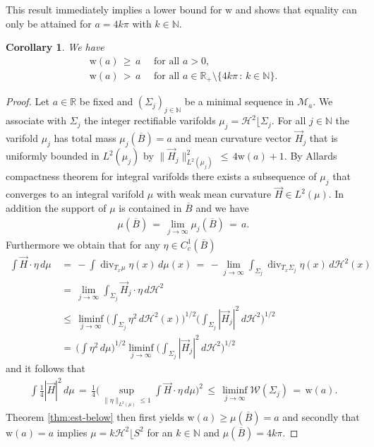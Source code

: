 \documentclass[reqno,makeidx,12pt]{amsart}
\theoremstyle{note}
\newtheorem{corollary}{Corollary}
\theoremstyle{definition}
\begin{document}
This result immediately implies a lower bound for ${\text{w}}$ and shows that equality can only be attained for $a=4k\pi$ with $k\in{\ensuremath{\mathbb{N}}}$.
\begin{corollary}\label{cor:est-below}
We have
\begin{gather*}
  {\text{w}}(a)\,\geq\, a\quad \text{ for all }a>0,\\
  {\text{w}}(a)\,>\, a\quad\text{ for all }a\in {\mathbb R}_+\setminus\{4k\pi
  \,:\,k\in{\ensuremath{\mathbb{N}}}\}.
\end{gather*}
\end{corollary}
\begin{proof}
Let $a\in{\mathbb R}$ be fixed and $(\Sigma_j)_{j\in{\ensuremath{\mathbb{N}}}}$ be a minimal sequence in
${\mathcal{M}}_a$. We associate with $\Sigma_j$ the integer rectifiable varifolds $\mu_j={\ensuremath{\mathcal{H}}}^2\lfloor
\Sigma_j$. For all $j\in {\ensuremath{\mathbb{N}}}$ the varifold $\mu_j$ has total mass $\mu_j(\overline{B})=a$ and 
mean curvature vector $\vec{H}_j$ that is uniformly bounded in $L^2(\mu_j)$ by $\|\vec{H}_j\|_{L^2(\mu_j)}^2\,\leq\,4{\text{w}}(a)+1$. By
Allards compactness theorem for integral varifolds \cite{Alla72}  there exists a
subsequence of $\mu_j$ that converges to an integral varifold $\mu$ with weak mean
curvature $\vec{H}\in L^2(\mu)$. In addition the support of $\mu$ is contained in $\overline{B}$ and we have
\begin{gather*}
  \mu(\overline{B})\,=\,\lim_{j\to\infty} \mu_j(\overline{B})\,=\, a.
\end{gather*}
Furthermore we obtain that for any $\eta\in C^1_c(\overline{B})$
\begin{align*}
  \int \vec{H}\cdot\eta\,d\mu \,&=\, -\int
  \operatorname{div}_{T_x\mu}\eta(x)\,d\mu(x) \,=\, -\lim_{j\to\infty}\int_{\Sigma_j}
  \operatorname{div}_{T_x\Sigma_j}\eta(x)\,d{\ensuremath{\mathcal{H}}}^2(x) \\
  &=\, \lim_{j\to\infty}\int_{\Sigma_j}
  \vec{H}_j\cdot\eta\,d{\ensuremath{\mathcal{H}}}^2 \\
  &\leq\, \liminf_{j\to\infty}\Big(\int_{\Sigma_j}
  \eta^2\,d{\ensuremath{\mathcal{H}}}^2(x)\Big)^{1/2}\Big(\int_{\Sigma_j}
  |\vec{H}_j|^2\,d{\ensuremath{\mathcal{H}}}^2\Big)^{1/2}\\
  &=\, \Big(\int
  \eta^2\,d\mu\Big)^{1/2}\liminf_{j\to\infty}\Big(\int_{\Sigma_j}
  |\vec{H}_j|^2\,d{\ensuremath{\mathcal{H}}}^2\Big)^{1/2}
\end{align*}
and it follows that
\begin{gather*}
  \int \frac{1}{4}|\vec{H}|^2\,d\mu \,=\, \frac{1}{4}\Big(\sup_{\|\eta\|_{L^2(\mu)}\leq 1}
  \int \vec{H}\cdot\eta\,d\mu\Big)^2\,\leq\, \liminf_{j\to\infty}
  {\mathcal{W}}(\Sigma_j)\,=\, 
  {\text{w}}(a).
\end{gather*}
Theorem \ref{thm:est-below} then first yields ${\text{w}}(a)\geq \mu(\overline{B})=a$ and secondly that ${\text{w}}(a)=a$ implies
$\mu=k{\ensuremath{\mathcal{H}}}^2\lfloor S^2$ for an $k\in{\ensuremath{\mathbb{N}}}$ and $\mu(\overline{B})=4k\pi $.
\end{proof}
\end{document}
